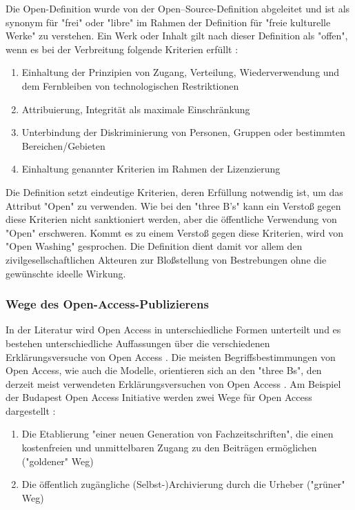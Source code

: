 Die Open-Definition wurde von der Open–Source-Definition abgeleitet und ist als synonym für "frei" oder "libre" im Rahmen der Definition für "freie kulturelle Werke" zu verstehen. Ein Werk oder Inhalt gilt nach dieser Definition als "offen", wenn es bei der Verbreitung folgende Kriterien erfüllt \cite{Open_Definition_2014}:
\begin{enumerate}
\item Einhaltung der Prinzipien von Zugang, Verteilung, Wiederverwendung und dem Fernbleiben von technologischen Restriktionen
\item Attribuierung, Integrität als maximale Einschränkung
\item Unterbindung der Diskriminierung von Personen, Gruppen oder bestimmten Bereichen/Gebieten
\item Einhaltung genannter Kriterien im Rahmen der Lizenzierung
\end{enumerate}

Die Definition setzt eindeutige Kriterien, deren Erfüllung notwendig ist, um das Attribut "Open" zu verwenden. Wie bei den "three B's" kann ein Verstoß gegen diese Kriterien nicht sanktioniert werden, aber die öffentliche Verwendung von "Open" erschweren. Kommt es zu einem Verstoß gegen diese Kriterien, wird von "Open Washing" gesprochen. Die Definition dient damit vor allem den zivilgesellschaftlichen Akteuren zur Bloßstellung von Bestrebungen ohne die gewünschte ideelle Wirkung.

\subsubsection{Wege des Open-Access-Publizierens}

In der Literatur wird Open Access in unterschiedliche Formen unterteilt \cite{CREATe_2014} \cite{Albert_2006} und es bestehen unterschiedliche Auffassungen über die verschiedenen Erklärungsversuche von Open Access \cite{CREATe_2014} \cite{Guedon_2004} \cite{Lewis_2012}. Die meisten Begriffsbestimmungen von Open Access, wie auch die Modelle, orientieren sich an den "three Bs", den derzeit meist verwendeten Erklärungsversuchen von Open Access \cite{Adema_2014}. Am Beispiel der Budapest Open Access Initiative werden zwei Wege für Open Access dargestellt \cite{Albert_2006}:
\begin{enumerate}
\item Die Etablierung "einer neuen Generation von Fachzeitschriften", die einen kostenfreien und unmittelbaren Zugang zu den Beiträgen ermöglichen ("goldener" Weg)
\item Die öffentlich zugängliche (Selbst-)Archivierung durch die Urheber ("grüner" Weg) \cite{Adema_2013} \cite{Hall_2008}
\end{enumerate}

